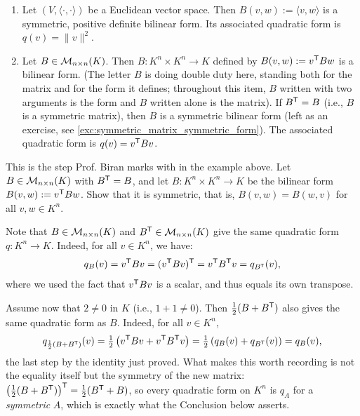 \begin{example}
\leavevmode
\begin{enumerate}
    \item Let $(V, \langle \cdot, \cdot \rangle)$ be a Euclidean vector space. Then $B(v, w) := \langle v, w \rangle$ is a symmetric, positive definite bilinear form. Its associated quadratic form is $q(v) = \|v\|^2$.
    \item Let $B \in \mathcal{M}_{n \times n}(K)$. Then $B \colon K^n \times K^n \to K$ defined by $B(v, w) := v^{\mathsf{T}} B w$ is a bilinear form. (The letter $B$ is doing double duty here, standing both for the matrix and for the form it defines; throughout this item, $B$ written with two arguments is the form and $B$ written alone is the matrix). If $B^{\mathsf{T}} = B$ (i.e., $B$ is a symmetric matrix), then $B$ is a symmetric bilinear form (left as an exercise, see \cref{exc:symmetric_matrix_symmetric_form}). The associated quadratic form is $q(v) = v^{\mathsf{T}} B v$.
\end{enumerate}
\end{example}

\begin{exercise}
\label{exc:symmetric_matrix_symmetric_form}
This is the step Prof. Biran marks with  in the example above. Let $B \in \mathcal{M}_{n \times n}(K)$ with $B^{\mathsf{T}} = B$, and let $B \colon K^n \times K^n \to K$ be the bilinear form $B(v, w) := v^{\mathsf{T}} B w$. Show that it is symmetric, that is, $B(v, w) = B(w, v)$ for all $v, w \in K^n$.
\end{exercise}

\begin{remark}
Note that $B \in \mathcal{M}_{n \times n}(K)$ and $B^{\mathsf{T}} \in \mathcal{M}_{n \times n}(K)$ give the same quadratic form $q \colon K^n \to K$. Indeed, for all $v \in K^n$, we have:
\[
q_B(v) = v^{\mathsf{T}} B v = (v^{\mathsf{T}} B v)^{\mathsf{T}} = v^{\mathsf{T}} B^{\mathsf{T}} v = q_{B^{\mathsf{T}}}(v),
\]
where we used the fact that $v^{\mathsf{T}} B v$ is a scalar, and thus equals its own transpose.

Assume now that $2 \neq 0$ in $K$ (i.e., $1 + 1 \neq 0$). Then $\frac{1}{2}(B + B^{\mathsf{T}})$ also gives the same quadratic form as $B$.
Indeed, for all $v \in K^n$,
\[
q_{\frac{1}{2}(B + B^{\mathsf{T}})}(v) = \tfrac{1}{2}\left( v^{\mathsf{T}} B v + v^{\mathsf{T}} B^{\mathsf{T}} v \right) = \tfrac{1}{2}\left( q_B(v) + q_{B^{\mathsf{T}}}(v) \right) = q_B(v),
\]
the last step by the identity just proved. What makes this worth recording is not the equality itself but the symmetry of the new matrix: $\left(\frac{1}{2}(B + B^{\mathsf{T}})\right)^{\mathsf{T}} = \frac{1}{2}(B^{\mathsf{T}} + B)$, so every quadratic form on $K^n$ is $q_A$ for a \emph{symmetric} $A$, which is exactly what the Conclusion below asserts.
\end{remark}

